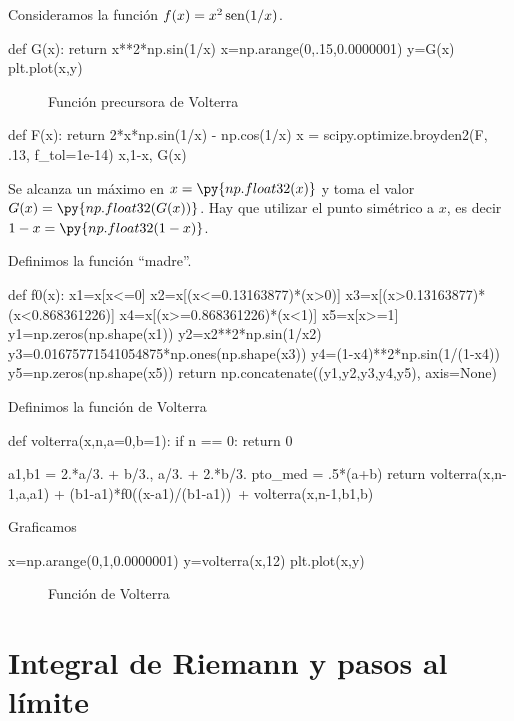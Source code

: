 Consideramos  la función $f(x)=x^2\operatorname{sen}(1/x)$. 

\begin{pyblock}
def G(x):
    return x**2*np.sin(1/x)
x=np.arange(0,.15,0.0000001)
y=G(x)
plt.plot(x,y)
\end{pyblock}


 \begin{figure}[h]
 \begin{center}
 \caption{Función precursora de Volterra}
\end{center}
 \end{figure}





\begin{pyblock}
def F(x):
    return 2*x*np.sin(1/x) - np.cos(1/x)
x = scipy.optimize.broyden2(F, .13, f_tol=1e-14)
x,1-x, G(x)
\end{pyblock}

Se alcanza un máximo en $x=\py{np.float32(x)}$ y toma el valor $G(x)=\py{np.float32(G(x))}$. Hay que utilizar el punto simétrico a $x$, es decir $1-x=\py{np.float32(1-x)}$.


Definimos la función ``madre''.



\begin{pyblock}
def f0(x):
    x1=x[x<=0]
    x2=x[(x<=0.13163877)*(x>0)]
    x3=x[(x>0.13163877)*(x<0.868361226)]
    x4=x[(x>=0.868361226)*(x<1)]
    x5=x[x>=1]
    y1=np.zeros(np.shape(x1))
    y2=x2**2*np.sin(1/x2)
    y3=0.01675771541054875*np.ones(np.shape(x3))
    y4=(1-x4)**2*np.sin(1/(1-x4))
    y5=np.zeros(np.shape(x5))
    return np.concatenate((y1,y2,y3,y4,y5), axis=None)
\end{pyblock}

Definimos la función de Volterra
\begin{pyverbatim}
def volterra(x,n,a=0,b=1):
    if n == 0:
        return 0
    
    a1,b1 = 2.*a/3. + b/3., a/3. + 2.*b/3.
    pto_med = .5*(a+b)
    return volterra(x,n-1,a,a1) + (b1-a1)*f0((x-a1)/(b1-a1))\
    + volterra(x,n-1,b1,b)
\end{pyverbatim}

Graficamos

\begin{pyverbatim}
x=np.arange(0,1,0.0000001)
y=volterra(x,12)
plt.plot(x,y)
\end{pyverbatim}


 \begin{figure}[h]
 \begin{center}
 \caption{Función de Volterra}
\end{center}
 \end{figure}


\section{Integral de Riemann y pasos al límite}

